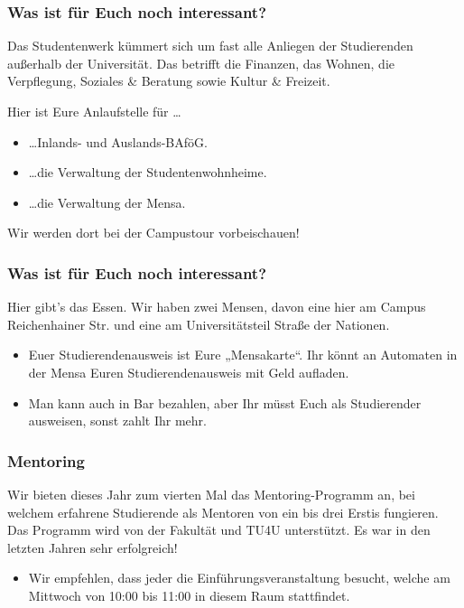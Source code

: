 \documentclass[10pt]{beamer}
\begin{document}
\begin{frame}
	\frametitle{Was ist für Euch noch interessant?}

	\begin{block}{\vphantom{X}}
		Das Studentenwerk kümmert sich um fast alle Anliegen der Studierenden außerhalb der Universität. Das betrifft die Finanzen, das Wohnen, die Verpflegung, Soziales \& Beratung sowie Kultur \& Freizeit.
	\end{block}

	Hier ist Eure Anlaufstelle für \ldots

	\begin{itemize}
		\item \ldots Inlands- und Auslands-BAföG.
		\item \ldots die Verwaltung der Studentenwohnheime.
		\item \ldots die Verwaltung der Mensa.
	\end{itemize}

	\vspace{1cm}

	Wir werden dort bei der Campustour vorbeischauen! 
\end{frame}

\begin{frame}
	\frametitle{Was ist für Euch noch interessant?}

	\begin{block}{\vphantom{X}}
		Hier gibt's das Essen. Wir haben zwei Mensen, davon eine hier am Campus Reichenhainer Str. und eine am Universitätsteil Straße der Nationen.
	\end{block}

	\begin{itemize}
		\item Euer Studierendenausweis ist Eure „Mensakarte“. Ihr könnt an Automaten in der Mensa Euren Studierendenausweis mit Geld aufladen. 
		\item Man kann auch in Bar bezahlen, aber Ihr müsst Euch als Studierender ausweisen, sonst zahlt Ihr mehr.
	\end{itemize}
\end{frame}

\begin{frame}
	\frametitle{Mentoring}

	\begin{block}{\vphantom{X}}
		Wir bieten dieses Jahr zum vierten Mal das Mentoring-Programm an, bei welchem erfahrene Studierende als Mentoren von ein bis drei Erstis fungieren. Das Programm wird von der Fakultät und TU4U unterstützt. Es war in den letzten Jahren sehr erfolgreich!
	\end{block}
	
	\begin{itemize}
		\item Wir empfehlen, dass jeder die Einführungsveranstaltung besucht, welche am Mittwoch von 10:00 bis 11:00 in diesem Raum stattfindet.
	\end{itemize}
\end{frame}
\end{document}
